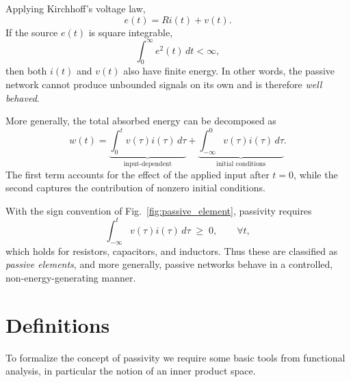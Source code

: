 Applying Kirchhoff’s voltage law,
\begin{equation}
    e(t) = R i(t) + v(t).
\end{equation}
If the source $e(t)$ is square integrable,
\begin{equation}
    \int_{0}^{\infty} e^{2}(t)\, dt < \infty,
\end{equation}
then both $i(t)$ and $v(t)$ also have finite energy. In other words, the passive network 
cannot produce unbounded signals on its own and is therefore \emph{well behaved}. 

\medskip
\noindent More generally, the total absorbed energy can be decomposed as
\begin{equation}
    w(t) = \underbrace{\int_{0}^{t} v(\tau) i(\tau)\, d\tau}_{\text{input-dependent}}
          + \underbrace{\int_{-\infty}^{0} v(\tau) i(\tau)\, d\tau}_{\text{initial conditions}}.
\end{equation}
The first term accounts for the effect of the applied input after $t=0$, 
while the second captures the contribution of nonzero initial conditions.  

With the sign convention of Fig.~\ref{fig:passive_element}, passivity requires
\begin{equation}
    \int_{-\infty}^{t} v(\tau) i(\tau)\, d\tau \;\geq\; 0, \qquad \forall t,
\end{equation}
which holds for resistors, capacitors, and inductors. 
Thus these are classified as \emph{passive elements}, and more generally, 
passive networks behave in a controlled, non-energy-generating manner.

\section{Definitions}

To formalize the concept of passivity we require some basic tools from functional analysis,
in particular the notion of an inner product space.

